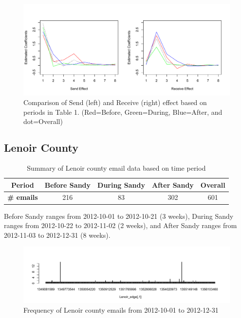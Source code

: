\documentclass[a4paper]{article}
\begin{document}
\footnotesize
\begin{figure}[ht]
	\centering
	\includegraphics[width=1.1\textwidth]{Dareplot.pdf} 
	\caption{Comparison of Send (left) and Receive (right) effect based on periods in Table 1. (Red=Before, Green=During, Blue=After, and dot=Overall)}	\label{fig:Emailplo22t}
\end{figure}
\subsection{Lenoir County}
\footnotesize
\begin{table}[ht]
	\centering
	\begin{tabular}{ |c|ccc|c| } 
		\hline 
		\textbf{Period} &\textbf{Before Sandy} & \textbf{During Sandy} & \textbf{After Sandy} & \textbf{Overall} \\ 	\hline
		\textbf{\# emails}& 216 & 83 & 302 & 601 \\ 
		\hline
	\end{tabular}
	\caption{ Summary of Lenoir county email data based on time period}
	\label{table:nullDare22}
\end{table}
\normalsize
Before Sandy ranges from 2012-10-01 to 2012-10-21 (3 weeks), During Sandy ranges from 2012-10-22 to 2012-11-02 (2 weeks), and After Sandy ranges from 2012-11-03 to 2012-12-31 (8 weeks).
\footnotesize
\begin{figure}[ht]
	\centering
	\includegraphics[width=1.1\textwidth]{LenoirEmails.pdf} 
	\caption{Frequency of Lenoir county emails from 2012-10-01 to 2012-12-31  }
	\label{fig:Emailplots32}
\end{figure}
\newpage
\end{document}
